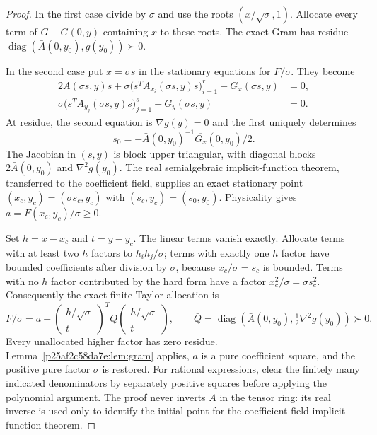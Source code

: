 \begin{proof}
In the first case divide by $\sigma$ and use the roots $(x/\sqrt\sigma,1)$. Allocate every term of $G-G(0,y)$ containing $x$ to these roots. The exact Gram has residue $\operatorname{diag}(\bar A(0,y_0),g(y_0))\succ0$.

In the second case put $x=\sigma s$ in the stationary equations for $F/\sigma$. They become
\begin{align*}
2A(\sigma s,y)s+\sigma\big(s^TA_{x_i}(\sigma s,y)s\big)_{i=1}^r
  +G_x(\sigma s,y)&=0,\\
\sigma\big(s^TA_{y_j}(\sigma s,y)s\big)_{j=1}^s
  +G_y(\sigma s,y)&=0.
\end{align*}
At residue, the second equation is $\nabla g(y)=0$ and the first uniquely determines
\[
s_0=-\bar A(0,y_0)^{-1}\overline{G_x}(0,y_0)/2.
\]
The Jacobian in $(s,y)$ is block upper triangular, with diagonal blocks
$2\bar A(0,y_0)$ and $\nabla^2g(y_0)$. The real semialgebraic implicit-function theorem, transferred to the coefficient field, supplies an exact stationary point $(x_c,y_c)=(\sigma s_c,y_c)$ with $(\bar s_c,\bar y_c)=(s_0,y_0)$. Physicality gives $a=F(x_c,y_c)/\sigma\ge0$.

Set $h=x-x_c$ and $t=y-y_c$. The linear terms vanish exactly. Allocate terms with at least two $h$ factors to $h_ih_j/\sigma$; terms with exactly one $h$ factor have bounded coefficients after division by $\sigma$, because $x_c/\sigma=s_c$ is bounded. Terms with no $h$ factor contributed by the hard form have a factor $x_c^2/\sigma=\sigma s_c^2$. Consequently the exact finite Taylor allocation is
\[
F/\sigma=a+
\begin{pmatrix}h/\sqrt\sigma\\t\end{pmatrix}^{\!T}
Q
\begin{pmatrix}h/\sqrt\sigma\\t\end{pmatrix},
\qquad
\bar Q=\operatorname{diag}\!\left(\bar A(0,y_0),\tfrac12\nabla^2g(y_0)\right)\succ0.
\]
Every unallocated higher factor has zero residue. Lemma~\ref{p25af2c58da7e:lem:gram} applies, $a$ is a pure coefficient square, and the positive pure factor $\sigma$ is restored. For rational expressions, clear the finitely many indicated denominators by separately positive squares before applying the polynomial argument. The proof never inverts $A$ in the tensor ring: its real inverse is used only to identify the initial point for the coefficient-field implicit-function theorem.
\end{proof}

